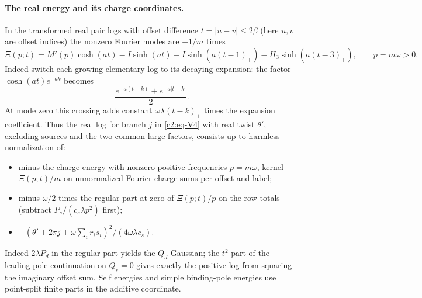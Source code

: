 \paragraph{The real energy and its charge coordinates.}
In the transformed real pair logs with offset difference \(t=|u-v|\le2\beta\) (here \(u,v\) are offset indices) the nonzero Fourier modes are \(-1/m\) times
\[
 \Xi(p;t)=M'(p)\cosh(at)-I\sinh(at)
     -I\sinh(a(t-1)_+)-H_3\sinh(a(t-3)_+),\qquad p=m\omega>0.
\]
Indeed switch each growing elementary log to its decaying expansion: the factor \(\cosh(at)e^{-ak}\) becomes
\[
 \frac{e^{-a(t+k)}+e^{-a|t-k|}}2.
\] At mode zero this crossing adds constant \(\omega\lambda(t-k)_+\) times the expansion coefficient. Thus the real log for branch \(j\) in \eqref{c2:eq-V4} with real twist \(\theta'\), excluding sources and the two common large factors, consists up to harmless normalization of:
\begin{itemize}
\item minus the charge energy with nonzero positive frequencies \(p=m\omega\), kernel \(\Xi(p;t)/m\) on unnormalized Fourier charge sums per offset and label;
\item minus \(\omega/2\) times the regular part at zero of \(\Xi(p;t)/p\) on the row totals (subtract \(P_s/(c_s\lambda p^2)\) first);
\item \(-(\theta'+2\pi j+\omega\sum_i r_i s_i)^2/(4\omega\lambda c_s)\).
\end{itemize}
Indeed \(2\lambda P_d\) in the regular part yields the \(Q_d\) Gaussian; the \(t^2\) part of the leading-pole continuation on \(Q_s=0\) gives exactly the positive log from squaring the imaginary offset sum. Self energies and simple binding-pole energies use point-split finite parts in the additive coordinate.


